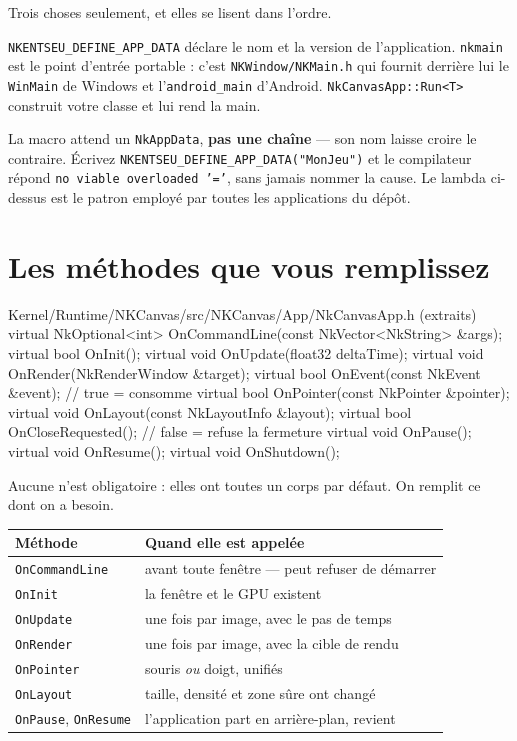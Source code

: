 Trois choses seulement, et elles se lisent dans l'ordre.

\texttt{NKENTSEU\_DEFINE\_APP\_DATA} déclare le nom et la version de
l'application. \texttt{nkmain} est le point d'entrée portable : c'est
\texttt{NKWindow/NKMain.h} qui fournit derrière lui le \texttt{WinMain} de
Windows et l'\texttt{android\_main} d'Android. \texttt{NkCanvasApp::Run<T>}
construit votre classe et lui rend la main.

\begin{nkpiege}
La macro attend un \texttt{NkAppData}, \textbf{pas une chaîne} --- son nom laisse
croire le contraire. Écrivez \texttt{NKENTSEU\_DEFINE\_APP\_DATA("MonJeu")} et le
compilateur répond \texttt{no viable overloaded '='}, sans jamais nommer la
cause. Le lambda ci-dessus est le patron employé par toutes les applications du
dépôt.
\end{nkpiege}

\section{Les méthodes que vous remplissez}

\begin{nkcode}{Kernel/Runtime/NKCanvas/src/NKCanvas/App/NkCanvasApp.h (extraits)}
virtual NkOptional<int> OnCommandLine(const NkVector<NkString> &args);
virtual bool OnInit();
virtual void OnUpdate(float32 deltaTime);
virtual void OnRender(NkRenderWindow &target);
virtual bool OnEvent(const NkEvent &event);      // true = consomme
virtual bool OnPointer(const NkPointer &pointer);
virtual void OnLayout(const NkLayoutInfo &layout);
virtual bool OnCloseRequested();                 // false = refuse la fermeture
virtual void OnPause();
virtual void OnResume();
virtual void OnShutdown();
\end{nkcode}

Aucune n'est obligatoire : elles ont toutes un corps par défaut. On remplit ce
dont on a besoin.

\begin{center}
\begin{tabular}{@{}ll@{}}
\toprule
\textbf{Méthode} & \textbf{Quand elle est appelée} \\
\midrule
\texttt{OnCommandLine} & avant toute fenêtre --- peut refuser de démarrer \\
\texttt{OnInit}        & la fenêtre et le GPU existent \\
\texttt{OnUpdate}      & une fois par image, avec le pas de temps \\
\texttt{OnRender}      & une fois par image, avec la cible de rendu \\
\texttt{OnPointer}     & souris \emph{ou} doigt, unifiés \\
\texttt{OnLayout}      & taille, densité et zone sûre ont changé \\
\texttt{OnPause}, \texttt{OnResume} & l'application part en arrière-plan, revient \\
\bottomrule
\end{tabular}
\end{center}

